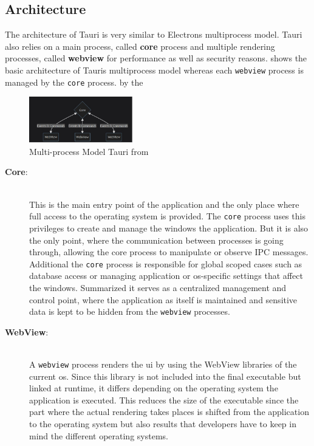 \subsection{Architecture}
\label{subsec:tauri:architecture}
The architecture of Tauri is very similar to Electrons multiprocess model.
Tauri also relies on a main process, called \textbf{core} process and multiple rendering processes, called \textbf{webview} for performance as well as security reasons.
 shows the basic architecture of Tauris multiprocess model whereas each \texttt{webview} process is managed by the \texttt{core} process.
by the
\begin{figure}[ht]
    \centering
    \includegraphics[width=0.4\textwidth]{images/TauriArchitecture}
    \caption{Multi-process Model Tauri from~\cite{tauri}}
    \label{fig:tauri:model}
\end{figure}

\begin{description}
    \item[\textbf{Core}:] \hfill \\ This is the main entry point of the application and the only place where full access to the operating system is provided.
    The \texttt{core} process uses this privileges to create and manage the windows the application.
    But it is also the only point, where the communication between processes is going through, allowing the core process to manipulate or observe \ac{IPC} messages.
    Additional the \texttt{core} process is responsible for global scoped cases such as database access or managing application or os-specific settings that affect the windows.
    Summarized it serves as a centralized management and control point, where the application as itself is maintained and sensitive data is kept to be hidden from the \texttt{webview} processes.


    \item[\textbf{WebView}:] \hfill \\ A \texttt{webview} process renders the ui by using the WebView libraries of the current os.
    Since this library is not included into the final executable but linked at runtime, it differs depending on the operating system the application is executed.
    This reduces the size of the executable since the part where the actual rendering takes places is shifted from the application to the operating system but also results
    that developers have to keep in mind the different operating systems.

\end{description}

